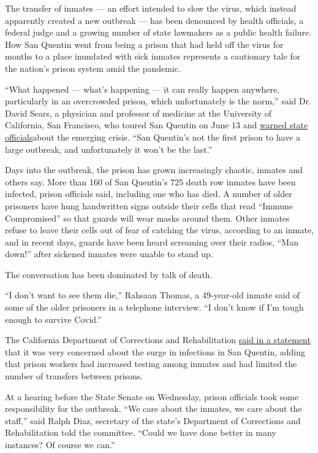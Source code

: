 The transfer of inmates --- an effort intended to slow the virus, which
instead apparently created a new outbreak --- has been denounced by
health officials, a federal judge and a growing number of state
lawmakers as a public health failure. How San Quentin went from being a
prison that had held off the virus for months to a place inundated with
sick inmates represents a cautionary tale for the nation's prison system
amid the pandemic.

``What happened --- what's happening --- it can really happen anywhere,
particularly in an overcrowded prison, which unfortunately is the
norm,'' said Dr. David Sears, a physician and professor of medicine at
the University of California, San Francisco, who toured San Quentin on
June 13 and
\href{https://www.documentcloud.org/documents/6956448-06-15-20-San-Quentin-Urgent-Memo.html}{warned
state officials}about the emerging crisis. ``San Quentin's not the first
prison to have a large outbreak, and unfortunately it won't be the
last.''

Days into the outbreak, the prison has grown increasingly chaotic,
inmates and others say. More than 160 of San Quentin's 725 death row
inmates have been infected, prison officials said, including one who has
died. A number of older prisoners have hung handwritten signs outside
their cells that read ``Immune Compromised'' so that guards will wear
masks around them. Other inmates refuse to leave their cells out of fear
of catching the virus, according to an inmate, and in recent days,
guards have been heard screaming over their radios, ``Man down!'' after
sickened inmates were unable to stand up.

The conversation has been dominated by talk of death.

``I don't want to see them die,'' Rahsaan Thomas, a 49-year-old inmate
said of some of the older prisoners in a telephone interview. ``I don't
know if I'm tough enough to survive Covid.''

The California Department of Corrections and Rehabilitation
\href{https://www.cdcr.ca.gov/covid19/}{said in a statement} that it was
very concerned about the surge in infections in San Quentin, adding that
prison workers had increased testing among inmates and had limited the
number of transfers between prisons.

At a hearing before the State Senate on Wednesday, prison officials took
some responsibility for the outbreak. ``We care about the inmates, we
care about the staff,'' said Ralph Diaz, secretary of the state's
Department of Corrections and Rehabilitation told the committee. ``Could
we have done better in many instances? Of course we can.''

